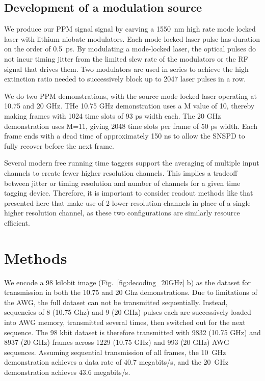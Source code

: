 \documentclass[11pt]{caltech_thesis} %
\begin{document}
\hypertarget{development-of-a-modulation-source}{%
\subsection{Development of a modulation source}\label{development-of-a-modulation-source}}

We produce our PPM signal signal by carving a 1550~nm high rate mode locked laser with lithium niobate modulators. Each mode locked laser pulse has duration on the order of 0.5~ps. By modulating a mode-locked laser,
the optical pulses do not incur timing jitter from the limited slew rate of the modulators or the RF signal that drives them. Two modulators are used in series to achieve the high extinction ratio needed to successively block up to 2047 laser pulses in a row.

We do two PPM demonstrations, with the source mode locked laser operating at 10.75 and 20 GHz. THe 10.75 GHz demonstration uses a M value of 10, thereby making frames with 1024 time slots of 93 ps width each. The 20 GHz demonstration uses M=11, giving 2048 time slots per frame of 50 ps width. Each frame ends with a dead time of approximately 150 ns to allow the SNSPD to fully recover before the next frame.

Several modern free running time taggers support the averaging of multiple input channels to create fewer higher resolution channels. This implies a tradeoff between jitter or timing resolution and number of channels for a given time tagging device. Therefore, it is important to consider readout methods like that presented here that make use of 2 lower-resolution channels in place of a single higher resolution channel, as these two configurations are similarly resource efficient.

\hypertarget{methods}{%
\section{Methods}\label{methods}}

We encode a 98 kilobit image (Fig.~\ref{fig:decoding_20GHz} b) as the dataset for transmission in both the 10.75 and 20 Ghz demonstrations. Due to limitations of the AWG, the full dataset can not be transmitted sequentially. Instead, sequencies of 8 (10.75 Ghz) and 9 (20 GHz) pulses each are successively loaded into AWG memory, transmitted several times, then switched out for the next sequence. The 98 kbit dataset is therefore transmitted with 9832 (10.75 GHz) and 8937 (20 GHz) frames across 1229 (10.75 GHz) and 993 (20 GHz) AWG sequences. Assuming sequential transmission of all frames, the 10~GHz demonstration achieves a data rate of 40.7 megabits/s, and the 20~GHz demonstration achieves 43.6 megabits/s.
\end{document}
